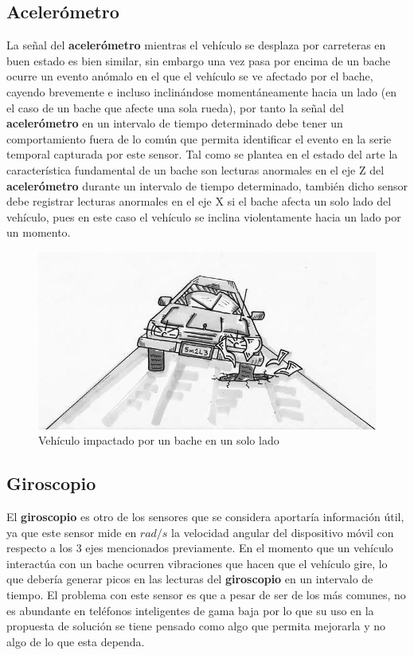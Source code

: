 	\subsection{Acelerómetro}
		La señal del \textbf{acelerómetro} mientras el vehículo se desplaza por carreteras en buen estado es bien similar,
		sin embargo una vez pasa por encima de un bache ocurre un evento anómalo en el que el vehículo se ve afectado
		por el bache, cayendo brevemente e incluso inclinándose momentáneamente hacia un lado (en el caso de un bache
		que afecte una sola rueda), por tanto la señal del \textbf{acelerómetro} en un intervalo de tiempo determinado debe tener
		un comportamiento fuera de lo común que permita identificar el evento en la serie temporal capturada por este sensor.
		Tal como se plantea en el estado del arte la característica fundamental de un bache son lecturas anormales en el eje
		Z del \textbf{acelerómetro} durante un intervalo de tiempo determinado, también dicho sensor debe registrar lecturas
		anormales en el eje X si el bache afecta un solo lado del vehículo, pues en este caso el vehículo se inclina violentamente
		hacia un lado por un momento.\\

	\begin{figure}[htb]
		\centering
		\includegraphics[scale = 0.5]{Graphics/one_side_pothole_vehicle.jpg}
		\caption{Vehículo impactado por un bache en un solo lado}
		\label{fig:2}
	\end{figure}

	\subsection{Giroscopio}
		El \textbf{giroscopio} es otro de los sensores que se considera aportaría información útil, ya que este sensor 
		mide en $rad/s$ la velocidad angular del dispositivo móvil con respecto a los 3 ejes mencionados previamente. 
		En el momento que un vehículo interactúa con un bache ocurren vibraciones que hacen que el vehículo gire, lo que
		debería generar picos en las lecturas del \textbf{giroscopio} en un intervalo de tiempo. El problema con este sensor es 
		que a pesar de ser de los más comunes, no es abundante en teléfonos inteligentes de gama baja por lo que 
		su uso en la propuesta de solución se tiene pensado como algo que permita mejorarla y no algo de lo que esta
		dependa.\\


